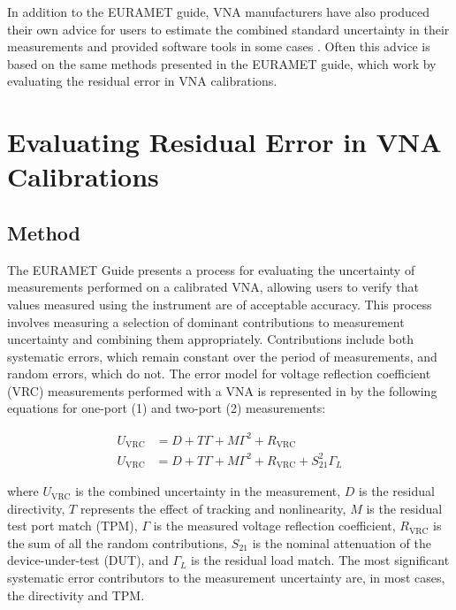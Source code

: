 \documentclass[../thesis/thesis.tex]{subfiles}
\begin{document}
\begin{refsection}
In addition to the EURAMET guide, VNA manufacturers have also produced their own advice for users to estimate the combined standard uncertainty in their measurements \cite{Hiebel_2008} and provided software tools in some cases \cite{KeysightUncTool, AnritsuUncTool}. Often this advice is based on the same methods presented in the EURAMET guide, which work by evaluating the residual error in VNA calibrations.

\section{Evaluating Residual Error in VNA Calibrations}

\subsection{Method}

The EURAMET Guide \cite{EURAMET_2011} presents a process for evaluating the uncertainty of measurements performed on a calibrated VNA, allowing users to verify that values measured using the instrument are of acceptable accuracy. This process involves measuring a selection of dominant contributions to measurement uncertainty and combining them appropriately. Contributions include both systematic errors, which remain constant over the period of measurements, and random errors, which do not.  The error model for voltage reflection coefficient (VRC) measurements performed with a VNA is represented in \cite{EURAMET_2011} by the following equations for one-port (1) and two-port (2) measurements:

\begin{align}
U_{\textrm{VRC}} &= D + T\Gamma + M\Gamma^2 + R_{\textrm{VRC}}\\
U_{\textrm{VRC}} &= D + T\Gamma + M\Gamma^2 + R_{\textrm{VRC}} + S_{21}^2\Gamma_L
\end{align}

where $U_{\textrm{VRC}}$ is the combined uncertainty in the measurement, $D$ is the residual directivity, $T$ represents the effect of tracking and nonlinearity, $M$ is the residual test port match (TPM), $\Gamma$ is the measured voltage reflection coefficient, $R_{\textrm{VRC}}$ is the sum of all the random contributions, $S_{21}$ is the nominal attenuation of the device-under-test (DUT), and $\Gamma_L$ is the residual load match. The most significant systematic error contributors to the measurement uncertainty are, in most cases, the directivity and TPM.


\end{refsection}
\end{document}
